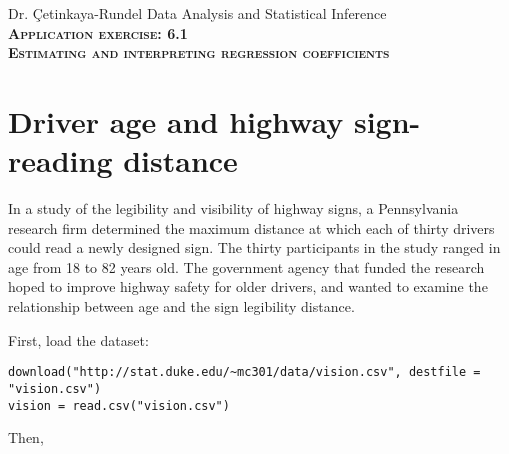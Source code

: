 \documentclass[11pt]{article}
\newcommand{\ttl}[1]{ \textsc{{\LARGE \textbf{{\color{oiB} #1} } }}}
\begin{document}
Dr. \c{C}etinkaya-Rundel \hfill Data Analysis and Statistical Inference \\

\ttl{Application exercise: 6.1 \\
Estimating and interpreting regression coefficients}

\section*{Driver age and highway sign-reading distance}

In a study of the legibility and visibility of highway signs, a Pennsylvania research firm determined the maximum distance at which each of thirty drivers could read a newly designed sign. The thirty participants in the study ranged in age from 18 to 82 years old. The government agency that funded the research hoped to improve highway safety for older drivers, and wanted to examine the relationship between age and the sign legibility distance.

First, load the dataset:

\begin{verbatim}
download("http://stat.duke.edu/~mc301/data/vision.csv", destfile = "vision.csv")
vision = read.csv("vision.csv")
\end{verbatim}

Then,
\end{document}
